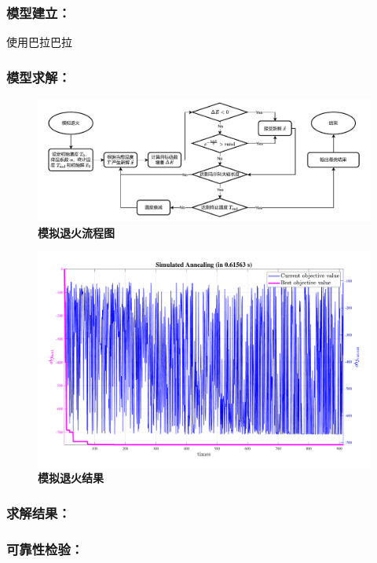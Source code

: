 \documentclass[zihao=-4, UTF8]{article}		%
\theoremstyle{MyLineTheoremStyle} %
\theoremstyle{MyBlockTheoremStyle} %
\theoremstyle{MySubsubsectionStyle} %
\begin{document}
\subsubsection{模型建立：}
使用巴拉巴拉
\subsubsection{模型求解：}

\begin{figure}[H]
  \centering
  \includegraphics[width=\textwidth]{assets/模拟退火流程图.drawio.pdf}
  \caption{\textbf{模拟退火流程图}}\label{模拟退火流程图}
\end{figure}

\begin{figure}[H]
  \centering
  \includegraphics[width=\textwidth]{assets/2024-08-15_13-50-23.pdf}
  \caption{\textbf{模拟退火结果}}\label{模拟退火结果}
\end{figure}

\subsubsection{求解结果：}
\subsubsection{可靠性检验：}
\end{document}
